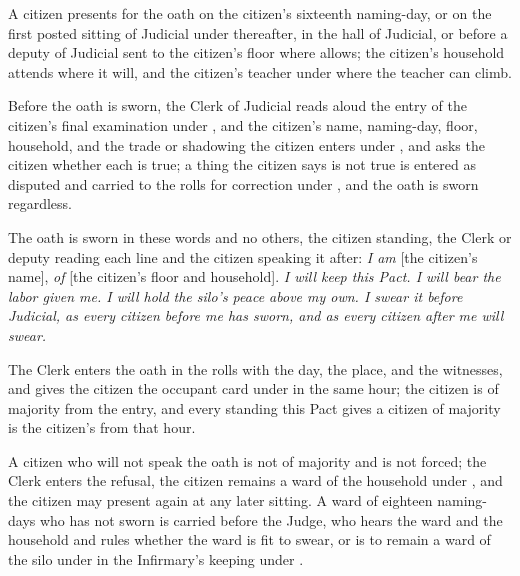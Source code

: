 \begin{clauses}
\item A citizen presents for the oath on the citizen's sixteenth naming-day, or on the first posted sitting of Judicial under  thereafter, in the hall of Judicial, or before a deputy of Judicial sent to the citizen's floor where  allows; the citizen's household attends where it will, and the citizen's teacher under  where the teacher can climb.
\item Before the oath is sworn, the Clerk of Judicial reads aloud the entry of the citizen's final examination under , and the citizen's name, naming-day, floor, household, and the trade or shadowing the citizen enters under , and asks the citizen whether each is true; a thing the citizen says is not true is entered as disputed and carried to the rolls for correction under , and the oath is sworn regardless.
\item The oath is sworn in these words and no others, the citizen standing, the Clerk or deputy reading each line and the citizen speaking it after: \emph{I am} [the citizen's name], \emph{of} [the citizen's floor and household]. \emph{I will keep this Pact. I will bear the labor given me. I will hold the silo's peace above my own. I swear it before Judicial, as every citizen before me has sworn, and as every citizen after me will swear.}
\item The Clerk enters the oath in the rolls with the day, the place, and the witnesses, and gives the citizen the occupant card under  in the same hour; the citizen is of majority from the entry, and every standing this Pact gives a citizen of majority is the citizen's from that hour.
\item A citizen who will not speak the oath is not of majority and is not forced; the Clerk enters the refusal, the citizen remains a ward of the household under , and the citizen may present again at any later sitting. A ward of eighteen naming-days who has not sworn is carried before the Judge, who hears the ward and the household and rules whether the ward is fit to swear, or is to remain a ward of the silo under  in the Infirmary's keeping under .
\end{clauses}

